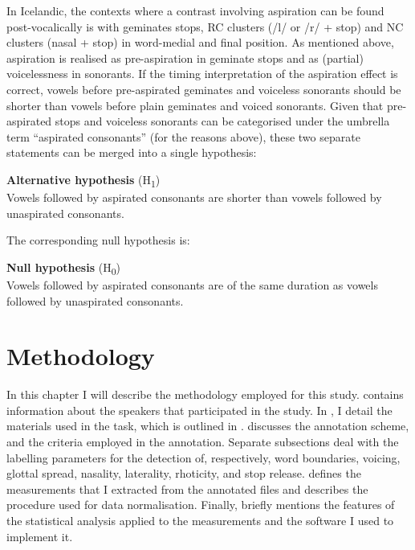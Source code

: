 \documentclass[11pt,a4paper,openany]{memoir}\usepackage[]{graphicx}\usepackage[]{color}
\begin{document}
In Icelandic, the contexts where a contrast involving aspiration can be found post-vocalically is with geminates stops, RC clusters (/l/ or /r/ + stop) and NC clusters (nasal + stop) in word-medial and final position.
As mentioned above, aspiration is realised as pre-aspiration in geminate stops and as (partial) voicelessness in sonorants.
If the timing interpretation of the aspiration effect is correct, vowels before pre-aspirated geminates and voiceless sonorants should be shorter than vowels before plain geminates and voiced sonorants.
Given that pre-aspirated stops and voiceless sonorants can be categorised under the umbrella term ``aspirated consonants'' (for the reasons above), these two separate statements can be merged into a single hypothesis:

\begin{exe}
\ex\label{h1} \textbf{Alternative hypothesis} (H\textsubscript{1}) \\
Vowels followed by aspirated consonants are shorter than vowels followed by unaspirated consonants.
\end{exe}

The corresponding null hypothesis is:

\begin{exe}
\ex\label{h0} \textbf{Null hypothesis} (H\textsubscript{0}) \\
Vowels followed by aspirated consonants are of the same duration as vowels followed by unaspirated consonants.
\end{exe}







\chapter{Methodology}
\label{c:methodology}
In this chapter I will describe the methodology employed for this study.
 contains information about the speakers that participated in the study.
In , I detail the materials used in the task, which is outlined in .
 discusses the annotation scheme, and the criteria employed in the annotation.
Separate subsections deal with the labelling parameters for the detection of, respectively, word boundaries, voicing, glottal spread, nasality, laterality, rhoticity, and stop release.
 defines the measurements that I extracted from the annotated files and describes the procedure used for data normalisation.
Finally,  briefly mentions the features of the statistical analysis applied to the measurements and the software I used to implement it.
\end{document}
